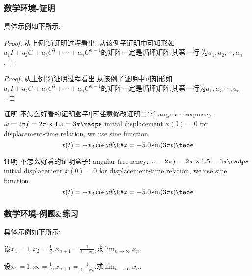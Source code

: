 \subsubsection{数学环境-证明}
具体示例如下所示:
\begin{proof}
    从上例(2)证明过程看出:
从该例子证明中可知形如$a_1 I+a_2 C+a_3 C^3+\cdots+a_n C^{n-1}$的矩阵一定是循环矩阵,其第一行\newline
为$a_1,a_2,\cdots,a_n$.
\end{proof}
\begin{tcblisting}{}
\begin{proof}
    从上例(2)证明过程看出,从该例子证明中可知形如$a_1 I+a_2 C+a_3 C^3+\cdots+a_n C^{n-1}$的矩阵一定是循环矩阵,其第一行为$a_1,a_2,\cdots,a_n$.
\end{proof}
\end{tcblisting}
\begin{kousiki}{证明}
    不怎么好看的证明盒子![可任意修改证明二字]
    angular frequency: $\omega = 2\pi f = 2\pi\times1.5 = 3 \pi \radps$
    initial displacement $x(0) = 0$
    for displacement-time relation, we use sine function
    \begin{equation*}
        x(t) = - x_0 \cos\omega t \RA x = - 5.0\sin(3\pi t) \teoe
    \end{equation*}
    
\end{kousiki}
\begin{tcblisting}{}
\begin{kousiki}{证明}
    不怎么好看的证明盒子!
    angular frequency: $\omega = 2\pi f = 2\pi\times1.5 = 3 \pi \radps$
    initial displacement $x(0) = 0$
    for displacement-time relation, we use sine function
    \begin{equation*}
        x(t) = - x_0 \cos\omega t \RA x = - 5.0\sin(3\pi t) \teoe
    \end{equation*}
\end{kousiki}
\end{tcblisting}

\subsubsection{数学环境-例题\&练习}
具体示例如下所示:
\begin{example}[][exam:1.1]
    \label{example:fixed point method 2}
    设$\displaystyle x_1=1,x_2=\frac{1}{2},x_{n+1}=\frac{1}{1+x_n}$,求$\displaystyle\lim_{n\to\infty}x_n$.
\end{example}
\begin{tcblisting}{}
\begin{example}[][exam:1.1]
    \label{example:fixed point method 2}
    设$\displaystyle x_1=1,x_2=\frac{1}{2},x_{n+1}=\frac{1}{1+x_n}$,求$\displaystyle\lim_{n\to\infty}x_n$.
\end{example}
\end{tcblisting}

